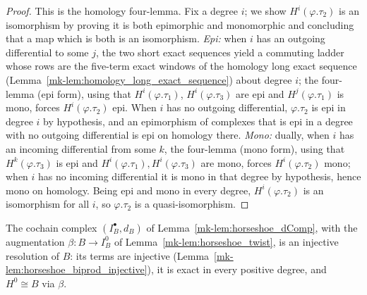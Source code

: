 \begin{proof}
  \leanok
  This is the homology four-lemma. Fix a degree \(i\); we show
  \(H^i(\varphi.\tau_2)\) is an isomorphism by proving it is both epimorphic and
  monomorphic and concluding that a map which is both is an isomorphism. \emph{Epi:}
  when \(i\) has an outgoing differential to some \(j\), the two short exact sequences
  yield a commuting ladder whose rows are the five-term exact windows of the homology
  long exact sequence (Lemma~\ref{mk-lem:homology_long_exact_sequence}) about degree
  \(i\); the four-lemma (epi form), using that \(H^i(\varphi.\tau_1)\),
  \(H^i(\varphi.\tau_3)\) are epi and \(H^j(\varphi.\tau_1)\) is mono, forces
  \(H^i(\varphi.\tau_2)\) epi. When \(i\) has no outgoing differential,
  \(\varphi.\tau_2\) is epi in degree \(i\) by hypothesis, and an epimorphism of
  complexes that is epi in a degree with no outgoing differential is epi on homology
  there. \emph{Mono:} dually, when \(i\) has an incoming differential from some \(k\),
  the four-lemma (mono form), using that \(H^k(\varphi.\tau_3)\) is epi and
  \(H^i(\varphi.\tau_1), H^i(\varphi.\tau_3)\) are mono, forces
  \(H^i(\varphi.\tau_2)\) mono; when \(i\) has no incoming differential it is mono in
  that degree by hypothesis, hence mono on homology. Being epi and mono in every
  degree, \(H^i(\varphi.\tau_2)\) is an isomorphism for all \(i\), so
  \(\varphi.\tau_2\) is a quasi-isomorphism.
\end{proof}

\begin{lemma}
  \label{mk-lem:horseshoe_resolvesMiddle}

  The cochain complex \((I_B^\bullet, d_B)\) of Lemma~\ref{mk-lem:horseshoe_dComp}, with the
  augmentation \(\beta : B \to I_B^0\) of Lemma~\ref{mk-lem:horseshoe_twist}, is an injective
  resolution of \(B\): its terms are injective
  (Lemma~\ref{mk-lem:horseshoe_biprod_injective}), it is exact in every positive degree, and
  \(H^0 \cong B\) via \(\beta\).
\end{lemma}

